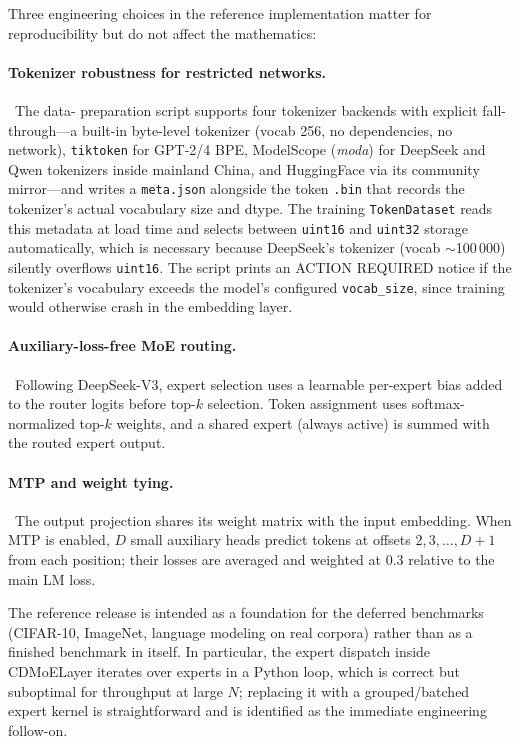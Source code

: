 \documentclass[aps,prx,onecolumn,11pt,nofootinbib,longbibliography]{revtex4-2}
\begin{document}
Three engineering choices in the reference implementation matter for
reproducibility but do not affect the mathematics:

\paragraph{Tokenizer robustness for restricted networks.}~The data-
preparation script supports four tokenizer backends with explicit
fall-through---a built-in byte-level tokenizer (vocab 256, no
dependencies, no network), \texttt{tiktoken} for GPT-2/4 BPE, ModelScope
(\textit{moda}) for DeepSeek and Qwen tokenizers inside mainland
China, and HuggingFace via its community mirror---and writes a
\texttt{meta.json} alongside the token \texttt{.bin} that records the
tokenizer's actual vocabulary size and dtype.  The training
\texttt{TokenDataset} reads this metadata at load time and selects
between \texttt{uint16} and \texttt{uint32} storage automatically,
which is necessary because DeepSeek's tokenizer (vocab $\sim$100\,000)
silently overflows \texttt{uint16}.  The script prints an ACTION
REQUIRED notice if the tokenizer's vocabulary exceeds the model's
configured \texttt{vocab\_size}, since training would otherwise crash
in the embedding layer.

\paragraph{Auxiliary-loss-free MoE routing.}~Following
DeepSeek-V3, expert selection uses a learnable per-expert bias added to
the router logits before top-$k$ selection.  Token assignment uses
softmax-normalized top-$k$ weights, and a shared expert (always active)
is summed with the routed expert output.

\paragraph{MTP and weight tying.}~The output projection shares its
weight matrix with the input embedding.  When MTP is enabled,
$D$ small auxiliary heads predict tokens at offsets $2, 3,
\ldots, D+1$ from each position; their losses are averaged and weighted
at $0.3$ relative to the main LM loss.

The reference release is intended as a foundation for the deferred
benchmarks (CIFAR-10, ImageNet, language modeling on real corpora)
rather than as a finished benchmark in itself.  In particular, the
expert dispatch inside CDMoELayer iterates over experts in a Python
loop, which is correct but suboptimal for throughput at large $N$;
replacing it with a grouped/batched expert kernel is straightforward
and is identified as the immediate engineering follow-on.
\end{document}
